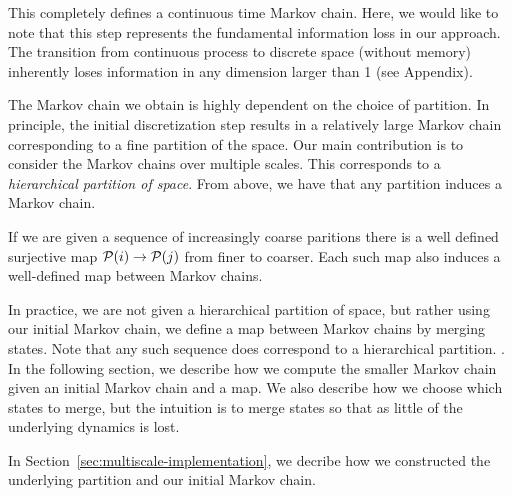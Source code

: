 This completely defines a continuous time Markov chain. Here, we would like to note that this step represents the fundamental information loss in our approach. The transition from continuous process to discrete space (without memory) inherently loses information in any dimension larger than 1 (see Appendix).  

The Markov chain we obtain is highly dependent on the choice of partition. In principle, the initial discretization step  results in a relatively large Markov chain corresponding to a fine partition of the space. Our main contribution is to consider the Markov chains over multiple scales. This corresponds to a \emph{hierarchical partition of space}. From above, we have that any partition induces a Markov chain. 

If we are given a sequence of increasingly coarse paritions there is a well defined surjective map 
$\mathcal{P}(i)\rightarrow\mathcal{P}(j)$ from finer to coarser. Each such map also induces a well-defined map between Markov chains. 

In practice, we are not given a hierarchical partition of space, but rather using our initial Markov chain, we define a map between Markov chains by merging states. Note that any such sequence does correspond to a hierarchical partition. .  In the following section, we describe how we compute the smaller Markov chain given an initial Markov chain and a map. We also describe how we choose which states to merge, but the intuition is to merge states so that as little of the underlying dynamics is lost. 

In Section~\ref{sec:multiscale-implementation}, we decribe how we constructed the underlying partition and our initial Markov chain.  




